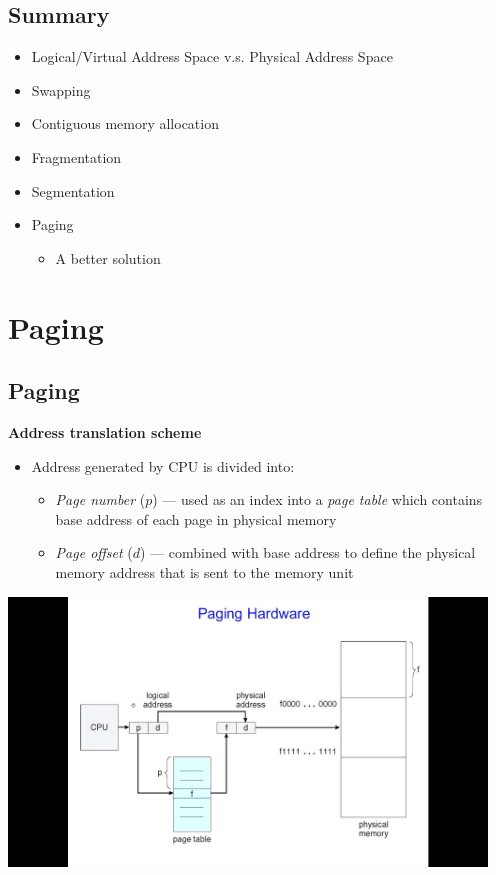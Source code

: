 \documentclass[11pt,a4paper]{article}
\begin{document}
\subsection{Summary}

\begin{itemize}
    \item Logical/Virtual Address Space v.s. Physical Address Space
    \item Swapping
    \item Contiguous memory allocation
    \item Fragmentation
    \item Segmentation
    \item Paging
        \begin{itemize}
            \item A better solution
        \end{itemize}
\end{itemize}

\break{}

\section{Paging}

\subsection{Paging}

\textbf{Address translation scheme}
\begin{itemize}
    \item Address generated by CPU is divided into:
        \begin{itemize}
            \item \emph{Page number} ($p$) --- used as an index into a \emph{page table}
                which contains base address of each page in physical memory
            \item \emph{Page offset} ($d$) --- combined with base address to define the
                physical memory address that is sent to the memory unit
        \end{itemize}
\end{itemize}

\includegraphics[height=270]{paging-hardware.jpg}
\end{document}
